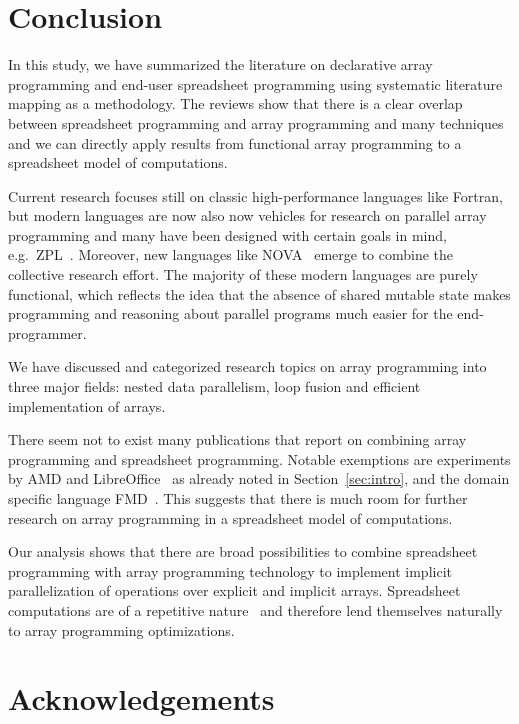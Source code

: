 \documentclass[a4paper]{article}
\begin{document}
\section{Conclusion}
\label{sec:conclusion}

In this study, we have summarized the literature on declarative array programming and end-user spreadsheet programming using systematic literature mapping as a methodology. The reviews show that there is a clear overlap between spreadsheet programming and array programming and many techniques and we can directly apply results from functional array programming to a spreadsheet model of computations.

Current research focuses still on classic high-performance languages like Fortran, but modern languages are now also now vehicles for research on parallel array programming and many have been designed with certain goals in mind, e.g.\ ZPL~\cite{Snyder2007Design}. Moreover, new languages like NOVA~\cite{Collins:2014:NFL:2627373.2627375} emerge to combine the collective research effort. The majority of these modern languages are purely functional, which reflects the idea that the absence of shared mutable state makes programming and reasoning about parallel programs much easier for the end-programmer.

We have discussed and categorized research topics on array programming into three major fields: nested data parallelism, loop fusion and efficient implementation of arrays.

There seem not to exist many publications that report on combining array programming and spreadsheet programming. Notable exemptions are experiments by AMD and LibreOffice~\cite{Trudeau2015Collaboration} as already noted in Section~\ref{sec:intro}, and the domain specific language FMD~\cite{Benfield:2009:FFD:1668113.1668121}. This suggests that there is much room for further research on array programming in a spreadsheet model of computations.

Our analysis shows that there are broad possibilities to combine spreadsheet programming with array programming technology to implement implicit parallelization of operations over explicit and implicit arrays. Spreadsheet computations are of a repetitive nature~\cite{1173080, Benfield:2009:FFD:1668113.1668121} and therefore lend themselves naturally to array programming optimizations.

\section*{Acknowledgements}
\end{document}
